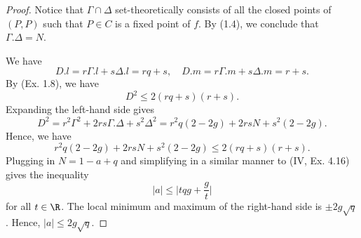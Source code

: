 \documentclass[a4paper]{article}
\begin{document}
\begin{enumerate} [label=\textbf{\arabic*.}, leftmargin=0em]
\begin{proof}
              Notice that $\Gamma \cap \Delta$ set-theoretically consists of all the closed points of $(P, P)$ such that $P \in C$ is a fixed point of $f$.
              By (1.4), we conclude that $\Gamma.\Delta = N$.

              We have
              \begin{equation*}
                  D.l = r\Gamma.l + s \Delta.l = rq + s, \quad D.m = r\Gamma.m + s\Delta.m = r + s.
              \end{equation*}
              By (Ex. 1.8), we have
              \begin{equation*}
                  D^2 \leq 2(rq + s)(r + s).
              \end{equation*}
              Expanding the left-hand side gives
              \begin{equation*}
                  D^2 = r^2\Gamma^2 + 2rs\Gamma.\Delta + s^2\Delta^2 = r^2q(2 - 2g) + 2rsN + s^2(2 - 2g).
              \end{equation*}
              Hence, we have
              \begin{equation*}
                  r^2q(2 - 2g) + 2rsN + s^2(2 - 2g) \leq 2(rq + s)(r + s).
              \end{equation*}
              Plugging in $N = 1 - a + q$ and simplifying in a similar manner to (IV, Ex. 4.16) gives the inequality
              \begin{equation*}
                  |a| \leq \bigg| t q g + \frac{g}{t} \bigg|
              \end{equation*}
              for all $t \in \R$.
              The local minimum and maximum of the right-hand side is $\pm 2 g \sqrt{q}$.
              Hence, $|a| \leq 2g \sqrt{q}$.
          \end{proof}



\end{enumerate}
\end{document}
